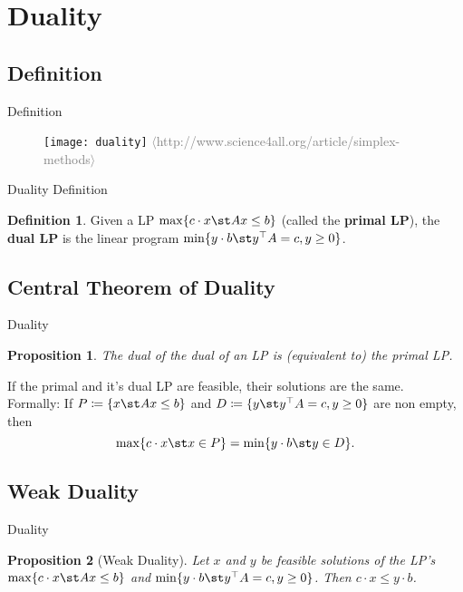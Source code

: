 \documentclass[a4paper, x11names, svgnames]{beamer}
\theoremstyle{definition}
\newtheorem*{defn}{Definition}
\theoremstyle{plain}
\newtheorem*{prop}{Proposition}
\theoremstyle{plain}
\begin{document}
\section{Duality}
\subsection{Definition}
\begin{frame}{Definition}
    \begin{figure}
        \center
        \texttt{[image: duality]}
        \vfill\center\scriptsize\textcolor{gray}{$\langle$http://www.science4all.org/article/simplex-methods$\rangle$}
    \end{figure}
\end{frame}

\begin{frame}{Duality Definition}
    \begin{defn}
        Given a LP $\max\{c\cdot x\st Ax\leq b\}$ (called the \textbf{primal LP}),
        the \textbf{dual LP} is the linear program $\min\{y\cdot b\st y^\top A =c, y\geq 0\}$.
    \end{defn}

\end{frame}

\subsection[Central Theorem]{Central Theorem of Duality}
\begin{frame}{Duality}
    \begin{prop}
        The dual of the dual of an LP is (equivalent to) the primal LP.
    \end{prop}
    \pause
    \begin{theorem}
        If the primal and it's dual LP are feasible, their solutions are the same. \\
        Formally: If $P\coloneqq\{x\st Ax\leq b\}$ and $D\coloneqq\{y\st y^\top A=c, y\geq 0\}$ are non empty,
        then \[\max\{c\cdot x\st x\in P\}=\min\{y\cdot b\st y\in D\}.\]
    \end{theorem}
\end{frame}

\subsection{Weak Duality}
\begin{frame}{Duality}
    \begin{prop}[Weak Duality]
        Let $x$ and $y$ be feasible solutions of the LP's $\max\{c\cdot x \st Ax \leq b\}$
        and $\min\{y\cdot b\st y^\top A = c, y\geq 0\}$.
        Then $c\cdot x \leq y \cdot b$.
    \end{prop}
\end{frame}
\end{document}
